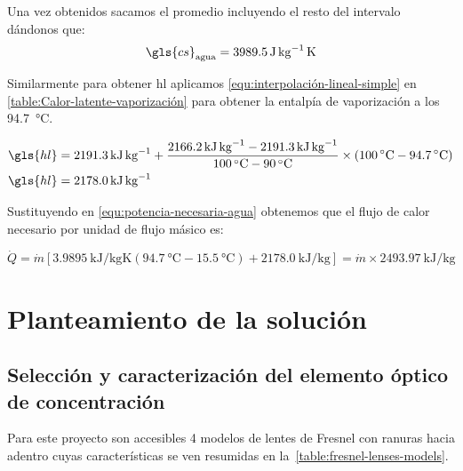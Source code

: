 			Una vez obtenidos sacamos el promedio incluyendo el resto del intervalo dándonos que:
			\begin{equation*}
				\gls{cs}_{\text{agua}} = \qty{3989.5}{\joule\per\kg\kelvin}
			\end{equation*}
			
			Similarmente para obtener \gls{hl} aplicamos \eqref{equ:interpolación-lineal-simple} en \cref{table:Calor-latente-vaporización} para obtener la entalpía de vaporización a los \qty{94.7}{\degreeCelsius}.
			
			\begin{align*}
				\gls{hl} &= \qty{2191.3}{\kilo\joule\per\kg} + \dfrac{\qty{2166.2}{\kilo\joule\per\kg} - \qty{2191.3}{\kilo\joule\per\kg}}{\qty{100}{\degreeCelsius}-\qty{90}{\degreeCelsius}} \times (\qty{100}{\degreeCelsius} - \qty{94.7}{\degreeCelsius})\\
				\gls{hl} &= \qty{2178.0}{\kilo\joule\per\kg}
			\end{align*}
			
			Sustituyendo en \eqref{equ:potencia-necesaria-agua} obtenemos que el flujo de calor necesario por unidad de flujo másico es:
			
			\begin{equation}\label{equ:potencia-necesaria-sistema}
				\dot{Q} = \dot{m}\left[\qty{3.9895}{\kilo\joule\per\kg\kelvin} \left(\qty{94.7}{\degreeCelsius}-\qty{15.5}{\degreeCelsius}\right) + \qty{2178.0}{\kilo\joule\per\kg}\right] = \dot{m} \times \qty{2493.97}{\kilo\joule\per\kg}
			\end{equation}
			
			
	\section{Planteamiento de la solución}
		\subsection{Selección y caracterización del elemento óptico de concentración}
			
			Para este proyecto son accesibles 4 modelos de lentes de Fresnel con ranuras hacia adentro cuyas características se ven resumidas en la~\cref{table:fresnel-lenses-models}.
			
